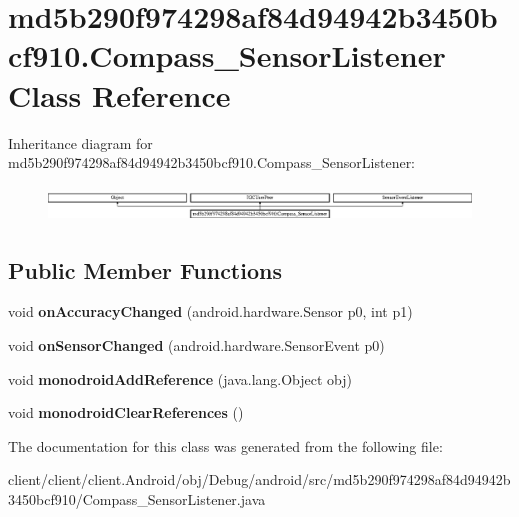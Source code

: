 \hypertarget{classmd5b290f974298af84d94942b3450bcf910_1_1Compass__SensorListener}{}\section{md5b290f974298af84d94942b3450bcf910.\+Compass\+\_\+\+Sensor\+Listener Class Reference}
\label{classmd5b290f974298af84d94942b3450bcf910_1_1Compass__SensorListener}
Inheritance diagram for md5b290f974298af84d94942b3450bcf910.\+Compass\+\_\+\+Sensor\+Listener\+:\begin{figure}[H]
\begin{center}
\leavevmode
\includegraphics[height=0.921811cm]{classmd5b290f974298af84d94942b3450bcf910_1_1Compass__SensorListener}
\end{center}
\end{figure}
\subsection*{Public Member Functions}
\begin{DoxyCompactItemize}
\item 
\hypertarget{classmd5b290f974298af84d94942b3450bcf910_1_1Compass__SensorListener_a984569ba9c337492141f15f3c7c3ed5a}{}void {\bfseries on\+Accuracy\+Changed} (android.\+hardware.\+Sensor p0, int p1)\label{classmd5b290f974298af84d94942b3450bcf910_1_1Compass__SensorListener_a984569ba9c337492141f15f3c7c3ed5a}

\item 
\hypertarget{classmd5b290f974298af84d94942b3450bcf910_1_1Compass__SensorListener_a500614873ace760590691c267e968d06}{}void {\bfseries on\+Sensor\+Changed} (android.\+hardware.\+Sensor\+Event p0)\label{classmd5b290f974298af84d94942b3450bcf910_1_1Compass__SensorListener_a500614873ace760590691c267e968d06}

\item 
\hypertarget{classmd5b290f974298af84d94942b3450bcf910_1_1Compass__SensorListener_ab6961513f6668027c34776dd1b9c60e2}{}void {\bfseries monodroid\+Add\+Reference} (java.\+lang.\+Object obj)\label{classmd5b290f974298af84d94942b3450bcf910_1_1Compass__SensorListener_ab6961513f6668027c34776dd1b9c60e2}

\item 
\hypertarget{classmd5b290f974298af84d94942b3450bcf910_1_1Compass__SensorListener_a10dc647252ae6a2b817d60bbd408be9d}{}void {\bfseries monodroid\+Clear\+References} ()\label{classmd5b290f974298af84d94942b3450bcf910_1_1Compass__SensorListener_a10dc647252ae6a2b817d60bbd408be9d}

\end{DoxyCompactItemize}


The documentation for this class was generated from the following file\+:\begin{DoxyCompactItemize}
\item 
client/client/client.\+Android/obj/\+Debug/android/src/md5b290f974298af84d94942b3450bcf910/Compass\+\_\+\+Sensor\+Listener.\+java\end{DoxyCompactItemize}
